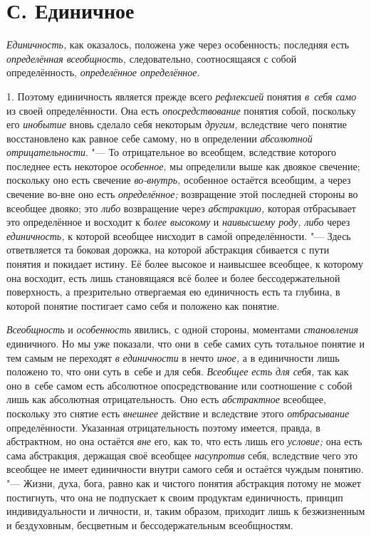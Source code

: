 \section[С. Единичное]{С. Единичное}

{\em Единичность,} как оказалось, положена уже через особенность; последняя
есть {\em определённая всеобщность,} следовательно, соотносящаяся с собой
определённость, {\em определённое определённое}.

1. Поэтому единичность является прежде всего {\em рефлексией} понятия
{\em в~себя само} из своей определённости. Она есть {\em опосредствование}
понятия собой, поскольку его {\em инобытие} вновь сделало себя некоторым
{\em другим,} вследствие чего понятие восстановлено как равное себе самому,
но в определении {\em абсолютной отрицательности}. "--- То отрицательное во
всеобщем, вследствие которого последнее есть некоторое {\em особенное,} мы
определили выше
как двоякое свечение; поскольку оно есть свечение {\em во-внутрь,}
особенное остаётся всеобщим, а через свечение во-вне оно есть
{\em определённое;} возвращение этой последней стороны во всеобщее двояко; это
{\em либо} возвращение через {\em абстракцию,}
которая отбрасывает это определённое и восходит к {\em более высокому} и
{\em наивысшему роду, либо} через {\em единичность,} к
которой всеобщее нисходит в сам\'{о}й определённости. "--- Здесь
ответвляется та боковая дорожка, на которой абстракция сбивается с пути
понятия и покидает истину. Её более высокое и наивысшее всеобщее, к
которому она восходит, есть лишь становящаяся всё более и более
бессодержательной поверхность, а презрительно отвергаемая ею единичность
есть та глубина, в которой понятие постигает само себя и положено как понятие.

{\em Всеобщность} и {\em особенность} явились, с одной стороны, моментами
{\em становления} единичного. Но мы уже показали, что они в~себе самих суть
тотальное понятие и тем самым не переходят {\em в единичности} в
нечто {\em иное,} а в единичности лишь положено то, что они суть
в~себе и для себя. {\em Всеобщее есть для себя,}
так как оно в~себе самом есть абсолютное опосредствование или
соотношение с собой лишь как абсолютная отрицательность. Оно есть
{\em абстрактное} всеобщее, поскольку это снятие есть {\em внешнее} действие
и вследствие этого {\em отбрасывание}
определённости. Указанная отрицательность поэтому имеется,
правда, в абстрактном, но она остаётся {\em вне} его, как то,
что есть лишь его {\em условие;}
она есть сама абстракция, держащая своё всеобщее {\em насупротив} себя,
вследствие чего это всеобщее не имеет единичности внутри самого себя и
остаётся чуждым понятию. "--- Жизни, духа, бога, равно как и
чистого понятия абстракция потому не может постигнуть, что она не
подпускает к своим продуктам единичность, принцип индивидуальности и
личности, и, таким образом, приходит лишь к безжизненным и бездуховным,
бесцветным и бессодержательным всеобщностям.

